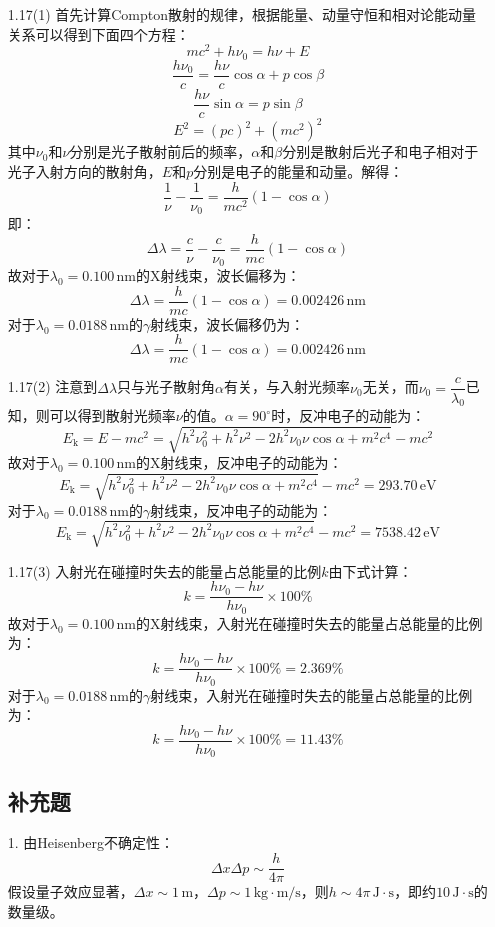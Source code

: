 \documentclass[a4paper,fontset=none]{ctexart}
\begin{document}
\begin{itemize}
        \item[1.17(1)]
        首先计算Compton散射的规律，根据能量、动量守恒和相对论能动量关系可以得到下面四个方程：
        \[
        mc^2 + h\nu_0 = h\nu + E
        \]
        \[
        \frac{h\nu_0}{c} = \frac{h\nu}{c}\cos\alpha + p\cos\beta
        \]
        \[
        \frac{h\nu}{c}\sin\alpha = p\sin\beta
        \]
        \[
        E^2 = (pc)^2 + \left(mc^2\right)^2
        \]
        其中$\nu_0$和$\nu$分别是光子散射前后的频率，$\alpha$和$\beta$分别是散射后光子和电子相对于光子入射方向的散射角，$E$和$p$分别是电子的能量和动量。解得：
        \[
        \frac{1}{\nu} - \frac{1}{\nu_0} = \frac{h}{mc^2}(1-\cos\alpha)
        \]
        即：
        \[
        \Delta\lambda = \frac{c}{\nu} - \frac{c}{\nu_0} = \frac{h}{mc}(1-\cos\alpha)
        \]
        故对于$\lambda_0 = 0.100\,\mathrm{nm}$的X射线束，波长偏移为：
        \[
        \Delta\lambda = \frac{h}{mc}(1-\cos\alpha) = 0.002426\,\mathrm{nm}
        \]
        对于$\lambda_0 = 0.0188\,\mathrm{nm}$的$\gamma$射线束，波长偏移仍为：
        \[
        \Delta\lambda = \frac{h}{mc}(1-\cos\alpha) = 0.002426\,\mathrm{nm}
        \]

        \item[1.17(2)]
        注意到$\Delta\lambda$只与光子散射角$\alpha$有关，与入射光频率$\nu_0$无关，而$\nu_0 = \dfrac{c}{\lambda_0}$已知，则可以得到散射光频率$\nu$的值。$\alpha = 90^\circ$时，反冲电子的动能为：
        \[
        E_\mathrm{k} = E - mc^2 = \sqrt{h^2\nu_0^2 + h^2\nu^2 - 2h^2\nu_0\nu\cos\alpha + m^2c^4} - mc^2
        \]
        故对于$\lambda_0 = 0.100\,\mathrm{nm}$的X射线束，反冲电子的动能为：
        \[
        E_\mathrm{k} = \sqrt{h^2\nu_0^2 + h^2\nu^2 - 2h^2\nu_0\nu\cos\alpha + m^2c^4} - mc^2 = 293.70\,\mathrm{eV}
        \]
        对于$\lambda_0 = 0.0188\,\mathrm{nm}$的$\gamma$射线束，反冲电子的动能为：
        \[
        E_\mathrm{k} = \sqrt{h^2\nu_0^2 + h^2\nu^2 - 2h^2\nu_0\nu\cos\alpha + m^2c^4} - mc^2 = 7538.42\,\mathrm{eV}
        \]

        \item[1.17(3)]
        入射光在碰撞时失去的能量占总能量的比例$k$由下式计算：
        \[
        k = \frac{h\nu_0 - h\nu}{h\nu_0} \times 100\%
        \]
        故对于$\lambda_0 = 0.100\,\mathrm{nm}$的X射线束，入射光在碰撞时失去的能量占总能量的比例为：
        \[
        k = \frac{h\nu_0 - h\nu}{h\nu_0} \times 100\% = 2.369\%
        \]
        对于$\lambda_0 = 0.0188\,\mathrm{nm}$的$\gamma$射线束，入射光在碰撞时失去的能量占总能量的比例为：
        \[
        k = \frac{h\nu_0 - h\nu}{h\nu_0} \times 100\% = 11.43\%
        \]

        \subsection*{补充题}

        \item[1.]
        由Heisenberg不确定性：
        \[
        \Delta x \Delta p \sim \dfrac{h}{4\pi}
        \]
        假设量子效应显著，$\Delta x \sim 1\,\mathrm{m}$，$\Delta p \sim 1\,\mathrm{kg\cdot m/s}$，则$h \sim 4\pi\,\mathrm{J\cdot s}$，即约$10\,\mathrm{J\cdot s}$的数量级。

    \end{itemize}
\end{document}
